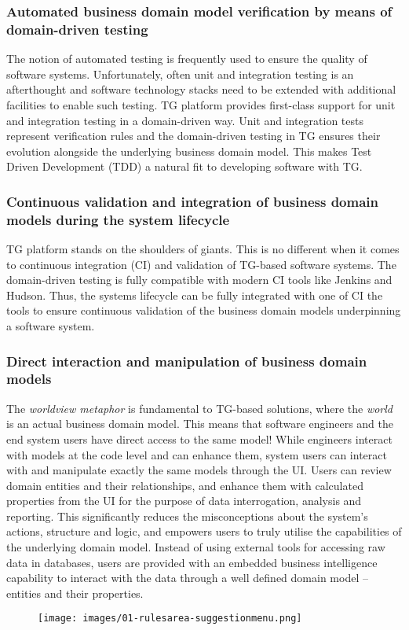 \documentclass[a4paper,10pt,twocolumn,oneside,openright,final]{memoir}
\begin{document}
\subsubsection*{Automated business domain model verification by means of domain-driven testing}
	The notion of automated testing is frequently used to ensure the quality of software systems.
	Unfortunately, often unit and integration testing is an afterthought and software technology stacks need to be extended with additional facilities to enable such testing.
	TG platform provides first-class support for unit and integration testing in a domain-driven way.
	Unit and integration tests represent verification rules and the domain-driven testing in TG ensures their evolution alongside the underlying business domain model.
	This makes Test Driven Development (TDD) a natural fit to developing software with TG.

\subsubsection*{Continuous validation and integration of business domain models during the system lifecycle}
	TG platform stands on the shoulders of giants.
	This is no different when it comes to continuous integration (CI) and validation of TG-based software systems.
	The domain-driven testing is fully compatible with modern CI tools like Jenkins and Hudson.
	Thus, the systems lifecycle can be fully integrated with one of CI the tools to ensure continuous validation of the business domain models underpinning a software system.

\subsubsection*{Direct interaction and manipulation of business domain models}
	The \emph{worldview metaphor} is fundamental to TG-based solutions, where the \emph{world} is an actual business domain model.
	This means that software engineers and the end system users have direct access to the same model!
	While engineers interact with models at the code level and can enhance them, system users can interact with and manipulate exactly the same models through the UI.
	Users can review domain entities and their relationships, and enhance them with calculated properties from the UI for the purpose of data interrogation, analysis and reporting.
	This significantly reduces the misconceptions about the system's actions, structure and logic, and empowers users to truly utilise the capabilities of the underlying domain model.
	Instead of using external tools for accessing raw data in databases, users are provided with an embedded business intelligence capability to interact with the data through a well defined domain model -- entities and their properties.
	\begin{figure}[!h]
  		\centering
  		\texttt{[image: images/01-rulesarea-suggestionmenu.png]}
		\vspace{-30pt}
  	\end{figure}
\end{document}
